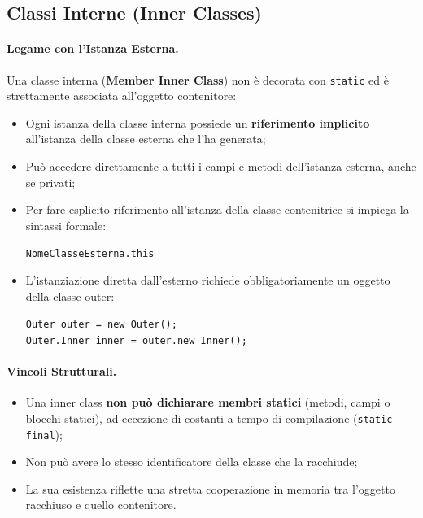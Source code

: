 \documentclass[12pt]{extarticle}
\begin{document}
\subsection{Classi Interne (Inner Classes)}

\paragraph{Legame con l'Istanza Esterna.}
Una classe interna (\textbf{Member Inner Class}) non è decorata con \texttt{static} ed è strettamente associata all'oggetto contenitore:
\begin{itemize}
    \item Ogni istanza della classe interna possiede un \textbf{riferimento implicito} all'istanza della classe esterna che l'ha generata;
    \item Può accedere direttamente a tutti i campi e metodi dell'istanza esterna, anche se privati;
    \item Per fare esplicito riferimento all'istanza della classe contenitrice si impiega la sintassi formale:
    \begin{center}
        \texttt{NomeClasseEsterna.this}
    \end{center}
    \item L'istanziazione diretta dall'esterno richiede obbligatoriamente un oggetto della classe outer:
    \begin{center}
        \texttt{Outer outer = new Outer();}\\
        \texttt{Outer.Inner inner = outer.new Inner();}
    \end{center}
\end{itemize}

\paragraph{Vincoli Strutturali.}
\begin{itemize}
    \item Una inner class \textbf{non può dichiarare membri statici} (metodi, campi o blocchi statici), ad eccezione di costanti a tempo di compilazione (\texttt{static final});
    \item Non può avere lo stesso identificatore della classe che la racchiude;
    \item La sua esistenza riflette una stretta cooperazione in memoria tra l'oggetto racchiuso e quello contenitore.
\end{itemize}
\end{document}
